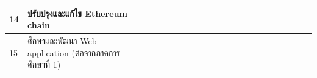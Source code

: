 \documentclass[12pt,oneside,openright,a4paper]{cpe-thai-project}
\begin{document}
\begin{table}[h]
{\begin{tabular}{|llllllllllllllllllllll|}
\multicolumn{1}{|l|}{14}                    & \multicolumn{1}{l|}{ปรับปรุงและแก้ไข Ethereum chain}                                      & \multicolumn{1}{l|}{\cellcolor[HTML]{2D8C9F}} & \multicolumn{1}{l|}{\cellcolor[HTML]{2D8C9F}} & \multicolumn{1}{l|}{\cellcolor[HTML]{2D8C9F}} & \multicolumn{1}{l|}{\cellcolor[HTML]{2D8C9F}} & \multicolumn{1}{l|}{\cellcolor[HTML]{2D8C9F}} & \multicolumn{1}{l|}{\cellcolor[HTML]{2D8C9F}} & \multicolumn{1}{l|}{\cellcolor[HTML]{2D8C9F}} & \multicolumn{1}{l|}{\cellcolor[HTML]{2D8C9F}} & \multicolumn{1}{l|}{\cellcolor[HTML]{2D8C9F}} & \multicolumn{1}{l|}{\cellcolor[HTML]{2D8C9F}} & \multicolumn{1}{l|}{\cellcolor[HTML]{2D8C9F}} & \multicolumn{1}{l|}{\cellcolor[HTML]{2D8C9F}} & \multicolumn{1}{l|}{\cellcolor[HTML]{2D8C9F}} & \multicolumn{1}{l|}{\cellcolor[HTML]{2D8C9F}} & \multicolumn{1}{l|}{\cellcolor[HTML]{2D8C9F}} & \multicolumn{1}{l|}{\cellcolor[HTML]{2D8C9F}} & \multicolumn{1}{l|}{\cellcolor[HTML]{2D8C9F}{\color[HTML]{2D8C9F} }} & \multicolumn{1}{l|}{\cellcolor[HTML]{2D8C9F}{\color[HTML]{2D8C9F} }} & \multicolumn{1}{l|}{\cellcolor[HTML]{2D8C9F}{\color[HTML]{2D8C9F} }} & \cellcolor[HTML]{2D8C9F}{\color[HTML]{2D8C9F} } \\ \hline
\multicolumn{1}{|l|}{15}                    & \multicolumn{1}{l|}{ศึกษาและพัฒนา Web application (ต่อจากภาคการศึกษาที่ 1)}               & \multicolumn{1}{l|}{\cellcolor[HTML]{2D8C9F}} & \multicolumn{1}{l|}{\cellcolor[HTML]{2D8C9F}} & \multicolumn{1}{l|}{\cellcolor[HTML]{2D8C9F}} & \multicolumn{1}{l|}{\cellcolor[HTML]{2D8C9F}} & \multicolumn{1}{l|}{\cellcolor[HTML]{2D8C9F}} & \multicolumn{1}{l|}{\cellcolor[HTML]{2D8C9F}} & \multicolumn{1}{l|}{\cellcolor[HTML]{2D8C9F}} & \multicolumn{1}{l|}{\cellcolor[HTML]{2D8C9F}} & \multicolumn{1}{l|}{\cellcolor[HTML]{2D8C9F}} & \multicolumn{1}{l|}{\cellcolor[HTML]{2D8C9F}} & \multicolumn{1}{l|}{\cellcolor[HTML]{2D8C9F}} & \multicolumn{1}{l|}{\cellcolor[HTML]{2D8C9F}} & \multicolumn{1}{l|}{\cellcolor[HTML]{2D8C9F}} & \multicolumn{1}{l|}{\cellcolor[HTML]{2D8C9F}} & \multicolumn{1}{l|}{\cellcolor[HTML]{2D8C9F}} & \multicolumn{1}{l|}{\cellcolor[HTML]{2D8C9F}} & \multicolumn{1}{l|}{\cellcolor[HTML]{2D8C9F}{\color[HTML]{2D8C9F} }} & \multicolumn{1}{l|}{\cellcolor[HTML]{2D8C9F}{\color[HTML]{2D8C9F} }} & \multicolumn{1}{l|}{\cellcolor[HTML]{2D8C9F}{\color[HTML]{2D8C9F} }} & \cellcolor[HTML]{2D8C9F}{\color[HTML]{2D8C9F} } \\ \hline

\end{tabular}}
\end{table}
\end{document}
